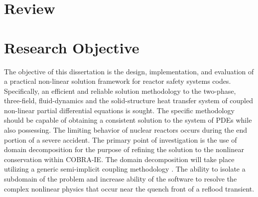 \section{Review}
\label{sect:review}

\section{Research Objective}
The objective of this dissertation is the design, implementation, and evaluation of a practical non-linear solution framework for reactor safety systems codes.
Specifically, an efficient and reliable solution methodology to the two-phase, three-field, fluid-dynamics and the solid-structure heat transfer system of coupled non-linear partial differential equations is sought.
The specific methodology should be capable of obtaining a consistent solution to the system of PDEs while also possessing. \cite{Aktas1996}
The limiting behavior of nuclear reactors occurs during the end portion of a severe accident.
The primary point of investigation is the use of domain decomposition for the purpose of refining the solution to the nonlinear conservation within COBRA-IE.
The domain decomposition will take place utilizing a generic semi-implicit coupling methodology \cite{Weaver2002}.
The ability to isolate a subdomain of the problem and increase ability of the software to resolve the complex nonlinear physics that occur near the quench front of a reflood transient.